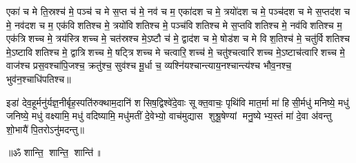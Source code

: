 

एका॑ च मे ति॒स्रश्च॑ मे॒ पञ्च॑ च मे स॒प्त च॑ मे॒ नव॑ च म॒ एका॑दश च मे॒ त्रयो॑दश च मे॒ पञ्च॑दश च मे स॒प्तद॑श च मे॒ नव॑दश च म॒ एक॑विशतिश्च मे॒ त्रयो॑विशतिश्च मे॒ पञ्च॑विशतिश्च मे स॒प्तविशतिश्च मे॒ नव॑विशतिश्च म॒ एक॑त्रिशच्च मे॒ त्रय॑स्त्रिशच्च मे॒ चत॑स्रश्च मे॒ऽष्टौ च॑ मे॒ द्वाद॑श च मे॒ षोड॑श च मे विश॒तिश्च॑ मे॒ चतु॑र्विशतिश्च मे॒ऽष्टाविशतिश्च मे॒ द्वात्रिशच्च मे॒ षट्त्रिशच्च मे चत्वारि॒शच्च॑ मे॒ चतु॑श्चत्वारिशच्च मे॒ऽष्टाच॑त्वारिशच्च मे॒ वाज॑श्च प्रस॒वश्चा॑पि॒जश्च॒ क्रतु॑श्च॒ सुव॑श्च मू॒र्धा च॒ व्यश्नि॑यश्चान्त्याय॒नश्चान्त्य॑श्च भौव॒नश्च॒ भुव॑न॒श्चाधि॑पतिश्च॥ 



\lbrack इडा॑ देव॒हूर्मनु॑र्यज्ञ॒नीर्बृह॒स्पति॑रुक्थाम॒दानि॑ शसिष॒द्विश्वे॑दे॒वाः सूक्त॒वाचः॒ पृथि॑वि मात॒र्मा मा॑ हिसी॒र्मधु॑ मनिष्ये॒ मधु॑ जनिष्ये॒ मधु॑ वक्ष्यामि॒ मधु॑ वदिष्यामि॒ मधु॑मतीं दे॒वेभ्यो॒ वाच॑मुद्यास शुश्रू॒षेण्यां मनु॒ष्येभ्य॒स्तं मा॑ दे॒वा अ॑वन्तु शो॒भायै॑ पि॒तरोऽनु॑मदन्तु॥\rbrack

\centerline{॥ॐ शान्ति॒ शान्ति॒ शान्ति॑॥}

{\small \closesection}


